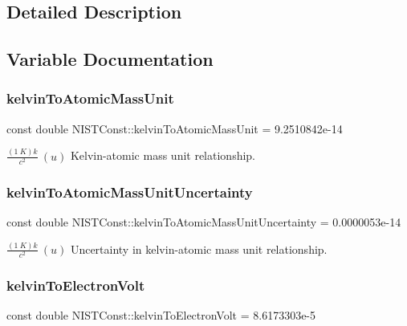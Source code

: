 \subsection{Detailed Description}


\subsection{Variable Documentation}
\mbox{\label{group___kelvin_gadad57a8f65f4d323846c97fbe0c485b1}} 
\subsubsection{\texorpdfstring{kelvin\+To\+Atomic\+Mass\+Unit}{kelvinToAtomicMassUnit}}
{\footnotesize\ttfamily const double N\+I\+S\+T\+Const\+::kelvin\+To\+Atomic\+Mass\+Unit = 9.\+2510842e-\/14}

$\frac{(1\ K)k}{c^2} \ (u)$ Kelvin-\/atomic mass unit relationship. \mbox{\label{group___kelvin_ga9a73cc5e600276756aa8054000db2a12}} 
\subsubsection{\texorpdfstring{kelvin\+To\+Atomic\+Mass\+Unit\+Uncertainty}{kelvinToAtomicMassUnitUncertainty}}
{\footnotesize\ttfamily const double N\+I\+S\+T\+Const\+::kelvin\+To\+Atomic\+Mass\+Unit\+Uncertainty = 0.\+0000053e-\/14}

$\frac{(1\ K)k}{c^2} \ (u)$ Uncertainty in kelvin-\/atomic mass unit relationship. \mbox{\label{group___kelvin_gae61d97fa154d94e710c951a26bd47896}} 
\subsubsection{\texorpdfstring{kelvin\+To\+Electron\+Volt}{kelvinToElectronVolt}}
{\footnotesize\ttfamily const double N\+I\+S\+T\+Const\+::kelvin\+To\+Electron\+Volt = 8.\+6173303e-\/5}

